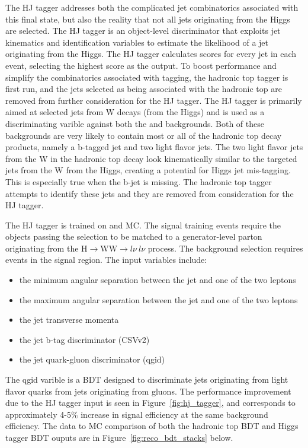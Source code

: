 The HJ tagger addresses both the complicated jet combinatorics associated with this final state, but also the reality that not all jets originating
from the Higgs are selected. The HJ tagger is an object-level discriminator that exploits jet kinematics and identification variables to estimate the likelihood
of a jet originating from the Higgs. The HJ tagger calculates scores for every jet in each event, selecting
the highest score as the output. To boost performance and simplify the combinatorics associated with tagging, the hadronic top tagger is first run,
and the jets selected as being associated with the hadronic top are removed from further consideration for the HJ tagger.
The HJ tagger is primarily aimed at selected jets from W decays (from the Higgs) and is used as a discriminating varible against both the \ttw and \ttz backgrounds.
Both of these
backgrounds are very likely to contain most or all of the hadronic top decay products, namely a b-tagged jet and two light flavor jets. The two light flavor jets from
the W in the hadronic top decay look kinematically similar to the targeted jets from the W from the Higgs, creating a potential for Higgs jet mis-tagging. This is
especially true when the b-jet is missing. The hadronic top tagger attempts to identify these jets and they are removed from consideration for the HJ tagger.

The HJ tagger is trained on \tth and \ttv MC. The signal training events require the objects passing the selection to be matched to a generator-level parton
originating from the H$\rightarrow$WW$\rightarrow l\nu~l\nu$ process. The background selection requires \ttv events in the signal region.  
The input variables include:
\begin{itemize}
\item the minimum angular separation between the jet and one of the two leptons
\item the maximum angular separation between the jet and one of the two leptons
\item the jet transverse momenta
\item the jet b-tag discriminator (CSVv2)
\item the jet quark-gluon discriminator (qgid)
\end{itemize}

\noindent The qgid varible is a BDT designed to discriminate jets originating from light flavor quarks from jets originating from gluons. The performance improvement due
to the HJ tagger input is seen in Figure~\ref{fig:hj_tagger}, and corresponds to approximately 4-5$\%$ increase in signal efficiency at the same background efficiency.
The data to MC comparison of both the hadronic top BDT and Higgs tagger BDT ouputs are in Figure~\ref{fig:reco_bdt_stacks} below.

